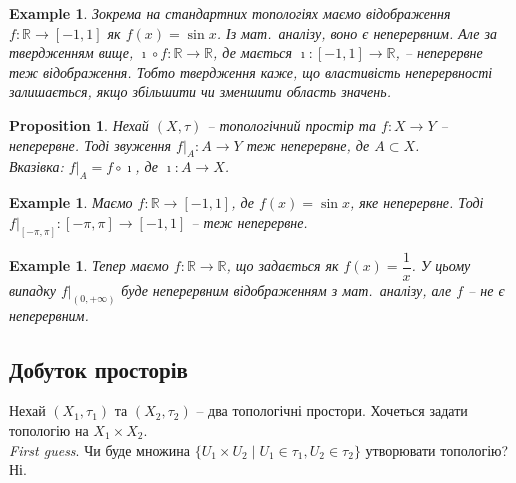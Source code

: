 \documentclass[a4paper, 10pt]{article}
\theoremstyle{theoremdd}
\newtheorem{example}[theorem]{Example}
\newtheorem{proposition}[theorem]{Proposition}
\begin{document}
\begin{example}
Зокрема на стандартних топологіях маємо відображення $f \colon \mathbb{R} \to [-1,1]$ як $f(x) = \sin x$. Із мат.\ аналізу, воно є неперервним. Але за твердженням вище, $\imath \circ f \colon \mathbb{R} \to \mathbb{R}$, де мається $\imath \colon [-1,1] \to \mathbb{R}$, -- неперервне теж відображення. Тобто твердження каже, що властивість неперервності залишається, якщо збільшити чи зменшити область значень.
\end{example}

\begin{proposition}
Нехай $(X,\tau)$ -- топологічний простір та $f \colon X \to Y$ -- неперервне. Тоді звуження $f \Big|_A \colon A \to Y$ теж неперервне, де $A \subset X$.\\
\textit{Вказівка: $f \Big|_A = f \circ \imath$, де $\imath \colon A \to X$.}
\end{proposition}

\begin{example}
Маємо $f \colon \mathbb{R} \to [-1,1]$, де $f(x) = \sin x$, яке неперервне. Тоді $f \Big|_{[-\pi,\pi]} \colon [-\pi,\pi] \to [-1,1]$ -- теж неперервне.
\end{example}

\begin{example}
Тепер маємо $f \colon \mathbb{R} \to \mathbb{R}$, що задається як $f(x) = \dfrac{1}{x}$. У цьому випадку $f \Big|_{(0,+\infty)}$ буде неперервним відображенням з мат.\ аналізу, але $f$ -- не є неперервним.
\end{example}

\subsection{Добуток просторів}
Нехай $(X_1,\tau_1)$ та $(X_2,\tau_2)$ -- два топологічні простори. Хочеться задати топологію на $X_1 \times X_2$. \\
\textit{First guess}. Чи буде множина $\{U_1 \times U_2 \mid U_1 \in \tau_1, U_2 \in \tau_2\}$ утворювати топологію? Ні.
\end{document}
